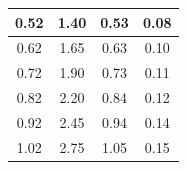 \begin{table}[h]
\begin{tabular}{|c|c|c|c|}
0.52                                                                     & 1.40                                                                                     & 0.53                                                                                              & 0.08                                                                                                                   \\ \hline
0.62                                                                     & 1.65                                                                                     & 0.63                                                                                              & 0.10                                                                                                                   \\ \hline
0.72                                                                     & 1.90                                                                                     & 0.73                                                                                              & 0.11                                                                                                                   \\ \hline
0.82                                                                     & 2.20                                                                                     & 0.84                                                                                              & 0.12                                                                                                                   \\ \hline
0.92                                                                     & 2.45                                                                                     & 0.94                                                                                              & 0.14                                                                                                                   \\ \hline
1.02                                                                     & 2.75                                                                                     & 1.05                                                                                              & 0.15                                                                                                                   \\ \hline

\end{tabular}
\end{table}
